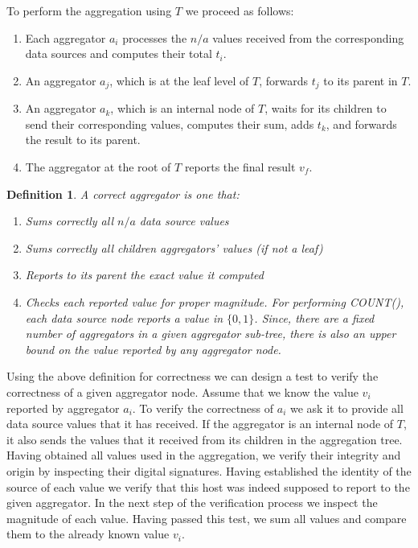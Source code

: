 \documentclass{article}
\newtheorem{defn}[thm]{Definition}
\begin{document}
To perform the aggregation using $T$ we proceed as follows:
\begin{enumerate}
  \item Each aggregator $a_i$ processes the $n/a$ values received from the
  corresponding data sources and computes their total $t_i$.
  \item An aggregator $a_j$, which is at the leaf level of $T$,
  forwards $t_j$ to its parent in $T$. 
  \item An aggregator $a_k$, which is an internal node of $T$, waits for its
  children to send their corresponding values, computes their sum, adds
  $t_k$, and forwards the result to its parent.
  \item The aggregator at the root of $T$ reports the final result $v_f$.
\end{enumerate}

\begin{defn}
A \emph{correct} aggregator is one that:
\begin{enumerate}
  \item Sums correctly all $n/a$ data source values
  \item Sums correctly all children aggregators' values (if not a leaf)
  \item Reports to its parent the exact value it computed
  \item Checks each reported value for proper magnitude. For
  performing COUNT(), each data source node reports a value in $\{0,
  1\}$. Since, there are a fixed number of aggregators in a given
  aggregator sub-tree, there is also an upper bound on the value
  reported by any aggregator node.
\end{enumerate}
\end{defn}

Using the above definition for correctness we can design a test to
verify the correctness of a given aggregator node. Assume that we know
the value $v_i$ reported by aggregator $a_i$. To verify the correctness
of $a_i$ we ask it to provide all data source values that it has
received. If the aggregator is an internal node of $T$, it also sends
the values that it received from its children in the aggregation
tree. Having obtained all values used in the aggregation, we verify
their integrity and origin by inspecting their digital
signatures. Having established the identity of the source of each
value we verify that this host was indeed supposed to report to the
given aggregator. In the next step of the verification process we
inspect the magnitude of each value. Having passed this test, we sum
all values and compare them to the already known value $v_i$. 
\end{document}
